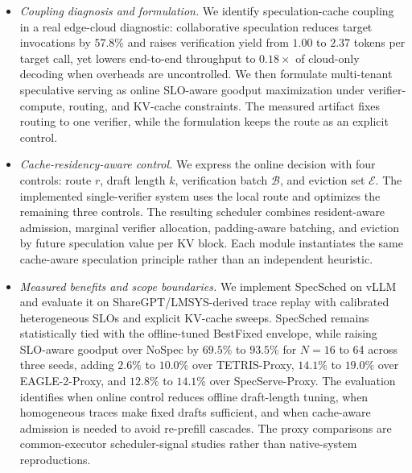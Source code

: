 \documentclass[journal]{IEEEtran}
\newcommand{\system}{SpecSched}
\begin{document}
\begin{itemize}
    \item \textit{Coupling diagnosis and formulation.}
    We identify speculation-cache coupling in a real edge-cloud
    diagnostic: collaborative speculation reduces target invocations by
    $57.8\%$ and raises verification yield from $1.00$ to $2.37$ tokens
    per target call, yet lowers end-to-end throughput to $0.18\times$
    of cloud-only decoding when overheads are uncontrolled. We then
    formulate multi-tenant speculative serving as online SLO-aware
    goodput maximization under verifier-compute, routing, and KV-cache
    constraints. The measured artifact fixes routing to one verifier,
    while the formulation keeps the route as an explicit control.

    \item \textit{Cache-residency-aware control.}
    We express the online decision with four controls:
    route $r$, draft length $k$, verification batch $\mathcal{B}$, and
    eviction set $\mathcal{E}$. The implemented single-verifier system
    uses the local route and optimizes the remaining three controls.
    The resulting scheduler combines resident-aware admission, marginal
    verifier allocation, padding-aware batching, and eviction by future
    speculation value per KV block. Each module instantiates the same
    cache-aware speculation principle rather than an independent
    heuristic.

    \item \textit{Measured benefits and scope boundaries.}
    We implement \system{} on vLLM and evaluate it on
    ShareGPT/LMSYS-derived trace replay with calibrated heterogeneous
    SLOs and explicit KV-cache sweeps.
    \system{} remains statistically tied with the offline-tuned
    BestFixed envelope, while raising SLO-aware goodput over NoSpec by
    $69.5\%$ to $93.5\%$ for $N=16$ to 64 across three seeds, adding
    $2.6\%$ to $10.0\%$ over TETRIS-Proxy, $14.1\%$ to $19.0\%$ over
    EAGLE-2-Proxy, and $12.8\%$ to $14.1\%$ over SpecServe-Proxy. The
    evaluation identifies when online control reduces offline
    draft-length tuning, when homogeneous traces make fixed drafts
    sufficient, and when cache-aware admission is needed to avoid
    re-prefill cascades. The proxy comparisons are common-executor
    scheduler-signal studies rather than native-system reproductions.
\end{itemize}

\end{document}
